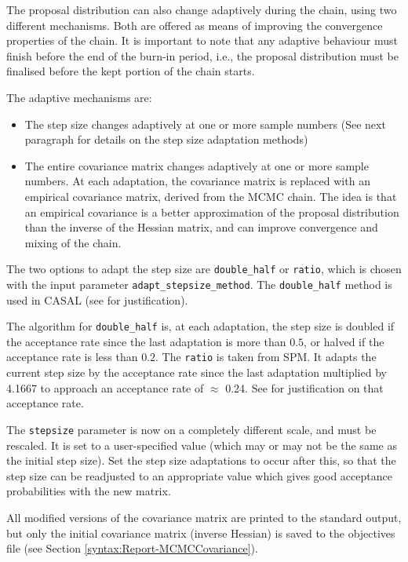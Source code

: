 The proposal distribution can also change adaptively during the chain, using two different mechanisms. Both are offered as means of improving the convergence properties of the chain. It is important to note that any adaptive behaviour must finish before the end of the burn-in period, i.e., the proposal distribution must be finalised before the kept portion of the chain starts.

The adaptive mechanisms are:

\begin{itemize}
\item The step size changes adaptively at one or more sample numbers (See next paragraph for details on the step size adaptation methods)
\item The entire covariance matrix changes adaptively at one or more sample numbers. At each adaptation, the covariance matrix is replaced with an empirical covariance matrix, derived from the MCMC chain. The idea is that an empirical covariance is a better approximation of the proposal distribution than the inverse of the Hessian matrix, and can improve convergence and mixing of the chain.
\end{itemize}

The two options to adapt the step size are \texttt{double\_half} or \texttt{ratio}, which is chosen with the input parameter \texttt{adapt\_stepsize\_method}. The \texttt{double\_half} method is used in CASAL (see \cite{823} for justification).

The algorithm for \texttt{double\_half} is, at each adaptation, the step size is doubled if the acceptance rate since the last adaptation is more than $0.5$, or halved if the acceptance rate is less than $0.2$. The \texttt{ratio} is taken from SPM. It adapts the current step size by the acceptance rate since the last adaptation multiplied by 4.1667 to approach an acceptance rate of $\approx$ 0.24. See \cite{mcmc_rate} for justification on that acceptance rate.

The \texttt{stepsize} parameter is now on a completely different scale, and must be rescaled. It is set to a user-specified value (which may or may not be the same as the initial step size). Set the step size adaptations to occur after this, so that the step size can be readjusted to an appropriate value which gives good acceptance probabilities with the new matrix.

All modified versions of the covariance matrix are printed to the standard output, but only the initial covariance matrix (inverse Hessian) is saved to the objectives file (see Section \ref{syntax:Report-MCMCCovariance}). \label{sec:Report-MCMCCovariance}  

